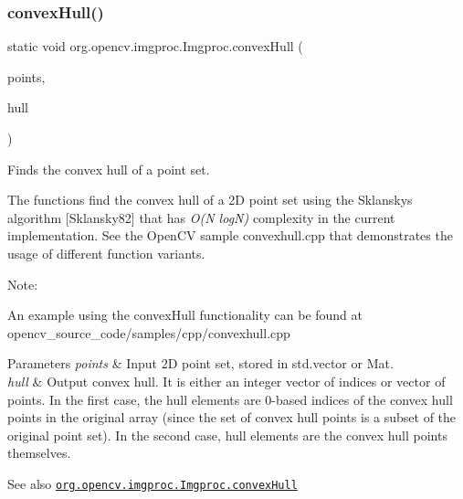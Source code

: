 \subsubsection{\texorpdfstring{convex\+Hull()}{convexHull()}\hspace{0.1cm}{\footnotesize\ttfamily [2/2]}}
{\footnotesize\ttfamily static void org.\+opencv.\+imgproc.\+Imgproc.\+convex\+Hull (\begin{DoxyParamCaption}\item[{\mbox{\hyperlink{classorg_1_1opencv_1_1core_1_1_mat_of_point}{Mat\+Of\+Point}}}]{points,  }\item[{\mbox{\hyperlink{classorg_1_1opencv_1_1core_1_1_mat_of_int}{Mat\+Of\+Int}}}]{hull }\end{DoxyParamCaption})\hspace{0.3cm}{\ttfamily [static]}}

Finds the convex hull of a point set.

The functions find the convex hull of a 2D point set using the Sklansky\textquotesingle{}s algorithm \mbox{[}Sklansky82\mbox{]} that has {\itshape O(\+N log\+N)} complexity in the current implementation. See the Open\+CV sample {\ttfamily convexhull.\+cpp} that demonstrates the usage of different function variants.

Note\+:


\begin{DoxyItemize}
\item An example using the convex\+Hull functionality can be found at opencv\+\_\+source\+\_\+code/samples/cpp/convexhull.\+cpp 
\end{DoxyItemize}


\begin{DoxyParams}{Parameters}
{\em points} & Input 2D point set, stored in {\ttfamily std.\+vector} or {\ttfamily Mat}. \\
\hline
{\em hull} & Output convex hull. It is either an integer vector of indices or vector of points. In the first case, the {\ttfamily hull} elements are 0-\/based indices of the convex hull points in the original array (since the set of convex hull points is a subset of the original point set). In the second case, {\ttfamily hull} elements are the convex hull points themselves.\\
\hline
\end{DoxyParams}
\begin{DoxySeeAlso}{See also}
\href{http://docs.opencv.org/modules/imgproc/doc/structural_analysis_and_shape_descriptors.html#convexhull}{\tt org.\+opencv.\+imgproc.\+Imgproc.\+convex\+Hull} 
\end{DoxySeeAlso}
\mbox{\label{classorg_1_1opencv_1_1imgproc_1_1_imgproc_a209ed56855c2b90701908839e25f773a}} 
